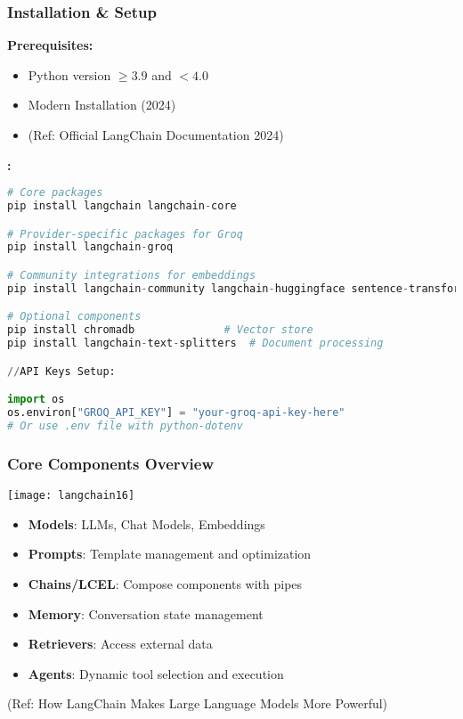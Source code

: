 \begin{frame}[fragile]\frametitle{Installation \& Setup}

\textbf{Prerequisites:}
\begin{itemize}
\item Python version $\geq 3.9$ and $< 4.0$
\item Modern Installation (2024)
\item {\tiny (Ref: Official LangChain Documentation 2024)}
\end{itemize}

\textbf{:}
\begin{lstlisting}[language=python, basicstyle=\tiny]
# Core packages
pip install langchain langchain-core

# Provider-specific packages for Groq
pip install langchain-groq

# Community integrations for embeddings
pip install langchain-community langchain-huggingface sentence-transformers

# Optional components
pip install chromadb              # Vector store
pip install langchain-text-splitters  # Document processing

//API Keys Setup:

import os
os.environ["GROQ_API_KEY"] = "your-groq-api-key-here"
# Or use .env file with python-dotenv
\end{lstlisting}


\end{frame}

\begin{frame}[fragile]\frametitle{Core Components Overview}

\begin{center}
\texttt{[image: langchain16]}
\end{center}

\begin{itemize}
\item \textbf{Models}: LLMs, Chat Models, Embeddings
\item \textbf{Prompts}: Template management and optimization
\item \textbf{Chains/LCEL}: Compose components with pipes
\item \textbf{Memory}: Conversation state management
\item \textbf{Retrievers}: Access external data
\item \textbf{Agents}: Dynamic tool selection and execution
\end{itemize}

{\tiny (Ref: How LangChain Makes Large Language Models More Powerful)}

\end{frame}

